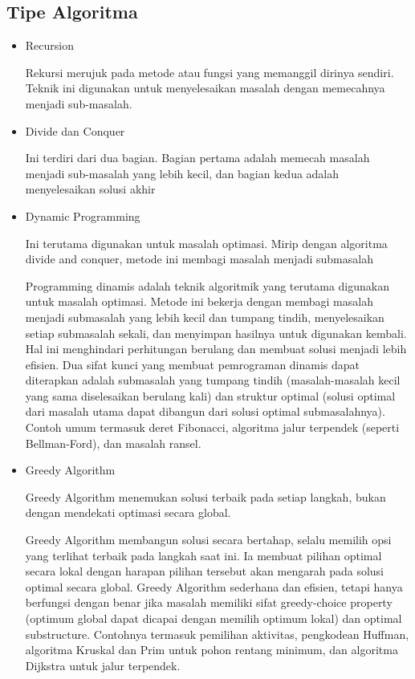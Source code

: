 \documentclass{article}
\begin{document}
\subsection{Tipe Algoritma}
\begin{itemize}
    \item Recursion

          Rekursi merujuk pada metode atau fungsi yang memanggil dirinya sendiri. Teknik ini digunakan untuk menyelesaikan masalah dengan memecahnya menjadi sub-masalah.
    \item Divide dan Conquer

          Ini terdiri dari dua bagian. Bagian pertama adalah memecah masalah menjadi sub-masalah yang lebih kecil, dan bagian kedua adalah menyelesaikan solusi akhir
    \item Dynamic Programming

          Ini terutama digunakan untuk masalah optimasi. Mirip dengan algoritma divide and conquer, metode ini membagi masalah menjadi submasalah

          Programming dinamis adalah teknik algoritmik yang terutama digunakan untuk masalah optimasi. Metode ini bekerja dengan membagi masalah menjadi submasalah yang lebih kecil dan tumpang tindih, menyelesaikan setiap submasalah sekali, dan menyimpan hasilnya untuk digunakan kembali. Hal ini menghindari perhitungan berulang dan membuat solusi menjadi lebih efisien. Dua sifat kunci yang membuat pemrograman dinamis dapat diterapkan adalah submasalah yang tumpang tindih (masalah-masalah kecil yang sama diselesaikan berulang kali) dan struktur optimal (solusi optimal dari masalah utama dapat dibangun dari solusi optimal submasalahnya). Contoh umum termasuk deret Fibonacci, algoritma jalur terpendek (seperti Bellman-Ford), dan masalah ransel.
    \item Greedy Algorithm

          Greedy Algorithm menemukan solusi terbaik pada setiap langkah, bukan dengan mendekati optimasi secara global.

          Greedy Algorithm membangun solusi secara bertahap, selalu memilih opsi yang terlihat terbaik pada langkah saat ini. Ia membuat pilihan optimal secara lokal dengan harapan pilihan tersebut akan mengarah pada solusi optimal secara global. Greedy Algorithm sederhana dan efisien, tetapi hanya berfungsi dengan benar jika masalah memiliki sifat greedy-choice property (optimum global dapat dicapai dengan memilih optimum lokal) dan optimal substructure. Contohnya termasuk pemilihan aktivitas, pengkodean Huffman, algoritma Kruskal dan Prim untuk pohon rentang minimum, dan algoritma Dijkstra untuk jalur terpendek.
\end{itemize}
\end{document}

